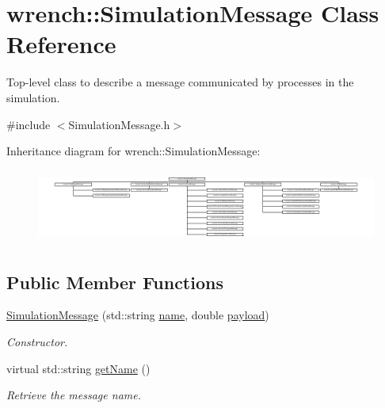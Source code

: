 \hypertarget{classwrench_1_1_simulation_message}{}\section{wrench\+:\+:Simulation\+Message Class Reference}
\label{classwrench_1_1_simulation_message}


Top-\/level class to describe a message communicated by processes in the simulation.  




{\ttfamily \#include $<$Simulation\+Message.\+h$>$}

Inheritance diagram for wrench\+:\+:Simulation\+Message\+:\begin{figure}[H]
\begin{center}
\leavevmode
\includegraphics[height=2.460064cm]{classwrench_1_1_simulation_message}
\end{center}
\end{figure}
\subsection*{Public Member Functions}
\begin{DoxyCompactItemize}
\item 
\hyperlink{classwrench_1_1_simulation_message_af5fbc8bd2864ceb9cdb2dc70c6e916c6}{Simulation\+Message} (std\+::string \hyperlink{classwrench_1_1_simulation_message_ab224f6dd8ec5ee2e7f65bfcdf2b8a86b}{name}, double \hyperlink{classwrench_1_1_simulation_message_a914f2732713f7c02898e66f05a7cb8a1}{payload})
\begin{DoxyCompactList}\small\item\em Constructor. \end{DoxyCompactList}\item 
virtual std\+::string \hyperlink{classwrench_1_1_simulation_message_a22bcfd675a4f9de8bb2a833f097bb484}{get\+Name} ()
\begin{DoxyCompactList}\small\item\em Retrieve the message name. \end{DoxyCompactList}\end{DoxyCompactItemize}
